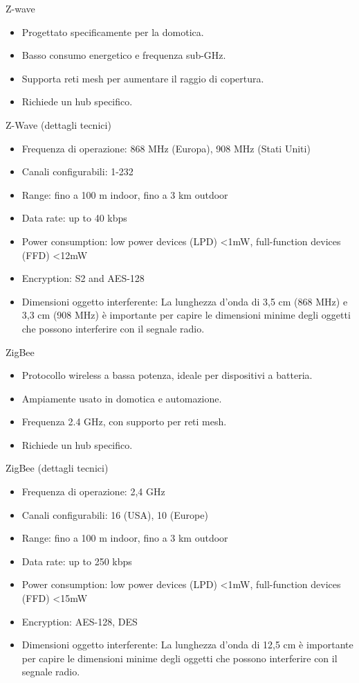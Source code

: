\documentclass{beamer}
\begin{document}
	\begin{frame}{Z-wave}
		\begin{itemize}
			\item Progettato specificamente per la domotica.
			\item Basso consumo energetico e frequenza sub-GHz.
			\item Supporta reti mesh per aumentare il raggio di copertura.
			\item Richiede un hub specifico.
		\end{itemize}
	\end{frame}
	\begin{frame}{Z-Wave (dettagli tecnici)}
		\begin{itemize}
			\item Frequenza di operazione: 868 MHz (Europa), 908 MHz (Stati Uniti)
			\item Canali configurabili: 1-232
			\item Range: fino a 100 m indoor, fino a 3 km outdoor
			\item Data rate: up to 40 kbps
			\item Power consumption: low power devices (LPD) <1mW, full-function devices (FFD) <12mW
			\item Encryption: S2 and AES-128
			\item Dimensioni oggetto interferente:
				La lunghezza d'onda di 3,5 cm (868 MHz) e 3,3 cm (908 MHz) è importante per capire le dimensioni minime degli oggetti che possono interferire con il segnale radio.
		\end{itemize}
	\end{frame}
	
	\begin{frame}{ZigBee}
		\begin{itemize}
			\item Protocollo wireless a bassa potenza, ideale per dispositivi a batteria.
			\item Ampiamente usato in domotica e automazione.
			\item Frequenza 2.4 GHz, con supporto per reti mesh.
			\item Richiede un hub specifico.
		\end{itemize}
	\end{frame}
	\begin{frame}{ZigBee (dettagli tecnici)}
		\begin{itemize}
			\item Frequenza di operazione: 2,4 GHz
			\item Canali configurabili: 16 (USA), 10 (Europe)
			\item Range: fino a 100 m indoor, fino a 3 km outdoor
			\item Data rate: up to 250 kbps
			\item Power consumption: low power devices (LPD) <1mW, full-function devices (FFD) <15mW
			\item Encryption: AES-128, DES
			\item Dimensioni oggetto interferente:
				La lunghezza d'onda di 12,5 cm è importante per capire le dimensioni minime degli oggetti che possono interferire con il segnale radio.
		\end{itemize}
	\end{frame}
	
\end{document}
